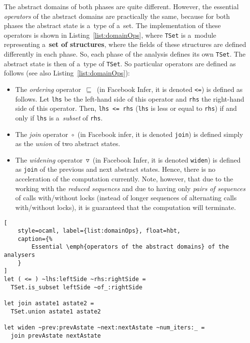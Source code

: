 \newpage
The abstract domains of both phases are quite different. However,
the essential \emph{operators} of the abstract domains are practically the
same, because for both phases the abstract state is a~type of a~set. The
implementation of these operators is shown in
Listing~\ref{list:domainOps}, where \texttt{TSet} is a~module representing
a~\textbf{set of structures}, where the fields of these structures are
defined differently in each phase. So, each phase of the analysis defines its
own \texttt{TSet}. The abstract state is then of a~type of \texttt{TSet}.
So particular operators are defined as follows (see also
Listing~\ref{list:domainOps}):
\begin{itemize}
    \item
        The \emph{ordering} operator~$ \sqsubseteq $~(in Facebook Infer,
        it is denoted \texttt{<=}) is defined as follows. Let \texttt{lhs} be
        the left-hand side of this operator and \texttt{rhs} the right-hand
        side of this operator. Then, \texttt{lhs~<=~rhs} (\texttt{lhs} is
        less or equal to \texttt{rhs}) if and only if
        \texttt{lhs} is a~\emph{subset} of \texttt{rhs}.

    \item
        The \emph{join} operator~$ \circ $~(in Facebook infer, it is
        denoted \texttt{join}) is defined simply as the \emph{union} of
        two abstract states.

    \item
        The \emph{widening} operator~$ \triangledown $~(in Facebook Infer,
        it is denoted \texttt{widen}) is defined as \texttt{join} of the
        previous and next abstract states. Hence, there is no acceleration
        of the computation currently. Note, however, that due to the
        working with the \emph{reduced sequences} and due to having only
        \emph{pairs of sequences} of calls with/without locks (instead of
        longer sequences of alternating calls with/without locks), it
        is guaranteed that the computation will terminate.
\end{itemize}

\begin{lstlisting}[
    style=ocaml, label={list:domainOps}, float=hbt,
    caption={%
        Essential \emph{operators of the abstract domains} of the analysers
    }
]
let ( <= ) ~lhs:leftSide ~rhs:rightSide =
  TSet.is_subset leftSide ~of_:rightSide

let join astate1 astate2 =
  TSet.union astate1 astate2

let widen ~prev:prevAstate ~next:nextAstate ~num_iters:_ =
  join prevAstate nextAstate
\end{lstlisting}


